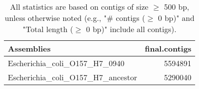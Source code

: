 \documentclass[12pt,a4paper]{article}
\begin{document}
\begin{table}[ht]
\begin{center}
\caption{All statistics are based on contigs of size $\geq$ 500 bp, unless otherwise noted (e.g., "\# contigs ($\geq$ 0 bp)" and "Total length ($\geq$ 0 bp)" include all contigs).}
\begin{tabular}{|l*{1}{|r}|}
\hline
Assemblies & final.contigs \\ \hline
Escherichia\_coli\_O157\_H7\_0940 & 5594891 \\ \hline
Escherichia\_coli\_O157\_H7\_ancestor & 5290040 \\ \hline
\end{tabular}
\end{center}
\end{table}
\end{document}
